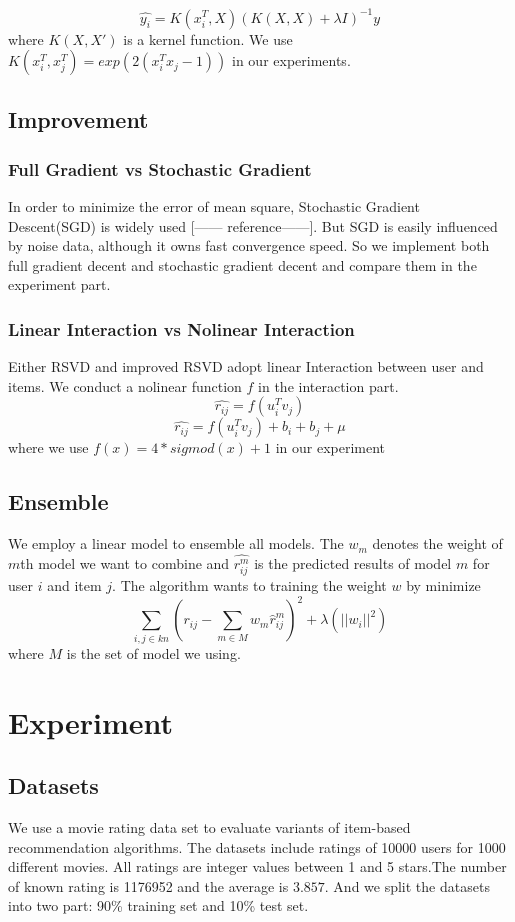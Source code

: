 \documentclass[10pt,conference,compsocconf]{IEEEtran}
\begin{document}
$$ \hat{y_i} = K(x_i^T, X)(K(X,X) + \lambda I)^{-1}y$$
where $K(X, X')$ is a kernel function. We use $K(x_{i}^{T}, x_{j}^{T})=exp(2(x_i^Tx_j-1))$ in our experiments.

\subsection{Improvement}
\subsubsection{Full Gradient vs Stochastic Gradient}
In order to minimize the error of mean square, Stochastic Gradient Descent(SGD) is widely used [------ reference------]. But SGD is easily influenced by noise data, although it owns fast convergence speed. So we implement both full gradient decent and stochastic gradient decent and compare them in the experiment part.

\subsubsection{Linear Interaction vs Nolinear Interaction}
Either RSVD and improved RSVD adopt linear Interaction between user and items. We conduct a nolinear function $f$ in the interaction part.
$$ \hat{r_{ij}}=f(u_{i}^{T}v_{j})$$
$$ \hat{r_{ij}}=f(u_{i}^{T}v_{j}) + b_i + b_j  + \mu $$
where we use $f(x) = 4*sigmod(x)+1$ in our experiment
\subsection{Ensemble}
We employ a linear model to ensemble all models. The $w_m$ denotes the weight of $m$th model we want to combine and $\hat{r_{ij}^m}$ is the predicted results of model $m$ for user $i$ and item $j$.
The algorithm wants to training the weight $w$ by minimize
$$  \sum_{i, j\in kn} (r_{ij} - \sum_{m\in M}w_m\hat r_{ij}^m)^2 + \lambda (||w_i||^2)  $$
where $M$ is the set of model we using.


\section{Experiment}
\subsection{Datasets}
We use a movie rating data set to evaluate variants of item-based recommendation algorithms. The datasets include ratings of 10000 users for 1000 different movies. All ratings are integer values between 1 and 5 stars.The number of known rating is 1176952 and the average is $3.857$. And we split the datasets into two part: 90\% training set and 10\% test set.
\end{document}
